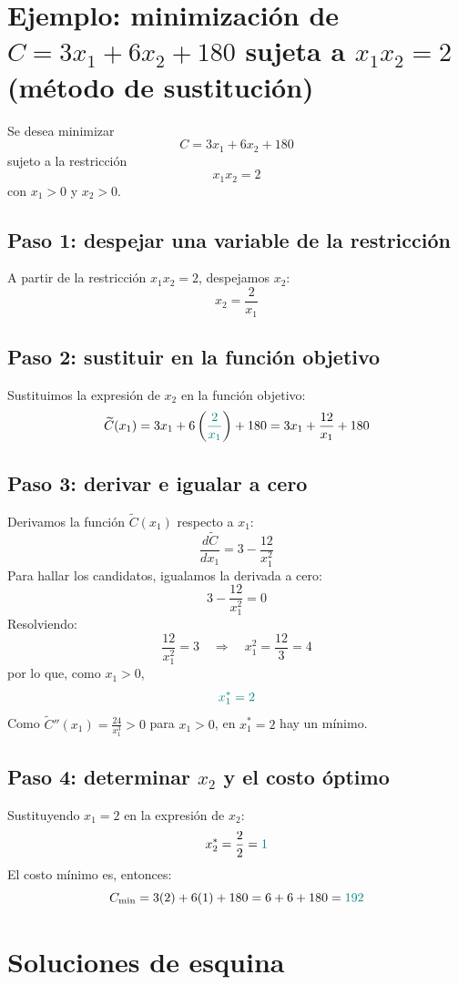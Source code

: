 \documentclass{article}
\begin{document}
 
\section*{Ejemplo: minimización de \(C = 3x_1 + 6x_2 + 180\) sujeta a \(x_1 x_2 = 2\) (método de sustitución)}
 
Se desea minimizar
\[
C = 3x_1 + 6x_2 + 180
\]
sujeto a la restricción
\[
x_1 x_2 = 2
\]
con \(x_1>0\) y \(x_2>0\).
 
\subsection*{Paso 1: despejar una variable de la restricción}
 
A partir de la restricción \(x_1 x_2 = 2\), despejamos \(x_2\):
\[
x_2 = \frac{2}{x_1}
\]
 
\subsection*{Paso 2: sustituir en la función objetivo}
 
Sustituimos la expresión de \(x_2\) en la función objetivo:
\[
\widetilde{C}(x_1) = 3x_1 + 6\left({\color{teal}\frac{2}{x_1}}\right) +180 = 3x_1 + \frac{12}{x_1} +180
\]
 
\subsection*{Paso 3: derivar e igualar a cero}
 
Derivamos la función \(\widetilde{C}(x_1)\) respecto a \(x_1\):
\[
\frac{d\widetilde{C}}{dx_1} = 3 - \frac{12}{x_1^2}
\]
Para hallar los candidatos, igualamos la derivada a cero:
\[
3 - \frac{12}{x_1^2} = 0
\]
Resolviendo:
\[
\frac{12}{x_1^2} = 3 \quad \Longrightarrow \quad x_1^2 = \frac{12}{3} = 4
\]
por lo que, como \(x_1>0\),
\[\color{teal}
x_1^* = 2
\]
Como \(\widetilde{C}''(x_1)=\frac{24}{x_1^3}>0\) para \(x_1>0\), en \(x_1^*=2\) hay un mínimo.
 
\subsection*{Paso 4: determinar \(x_2\) y el costo óptimo}
 
Sustituyendo \(x_1 = 2\) en la expresión de \(x_2\):
\[
x_2^* = \frac{2}{2} = {\color{teal}1}
\]
El costo mínimo es, entonces:
\[
C_{\min} = 3(2) + 6(1) + 180 = 6 + 6 + 180 = {\color{teal}192}
\]
 
 
\section*{Soluciones de esquina}
 
\end{document}
